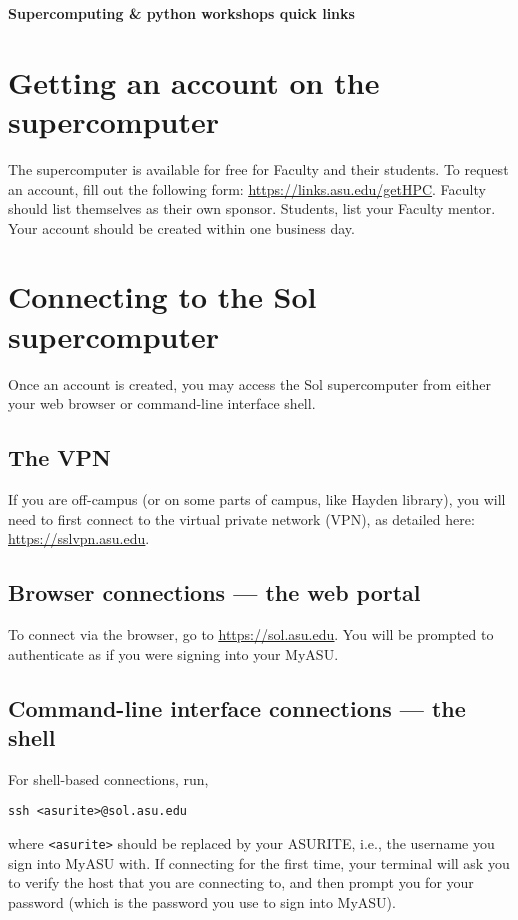 \documentclass[11pt]{article}
\newcommand{\myurl}[1]{\href{#1}{\color{blue}\setulcolor{blue}\ul{\mbox{#1}}}}
\def\gethpc{https://links.asu.edu/getHPC}
\begin{document}
{\centering\huge\bfseries Supercomputing \& python workshops quick links}

\setcounter{section}{-1}
\section{Getting an account on the supercomputer}

The supercomputer is available for free for Faculty and their students. 
To request an account, fill out the following form: 
\myurl{\gethpc}.
Faculty should list themselves as their own sponsor. 
Students, list your Faculty mentor.
Your account should be created within one business day.

\section{Connecting to the Sol supercomputer}

Once an account is created, you may access the Sol supercomputer from
either your web browser or command-line interface shell. 

\setcounter{subsection}{-1}
\subsection{The VPN}\label{sec:VPN}
If you are off-campus (or on some parts of campus, like Hayden library),
you will need to first connect to the virtual private network (VPN), as
detailed here:
\myurl{https://sslvpn.asu.edu}.

\subsection{Browser connections --- the web portal}\label{sec:ood}

To connect via the browser, go to
\myurl{https://sol.asu.edu}.
You will be prompted to authenticate as if you were signing into your
MyASU.

\subsection{Command-line interface connections --- the shell}\label{sec:shell}

For shell-based connections, run,
\begin{lstlisting}
ssh <asurite>@sol.asu.edu
\end{lstlisting}
where \texttt{<asurite>} should be replaced by your ASURITE, i.e., the
username you sign into MyASU with. If connecting for the first time,
your terminal will ask you to verify the host that you are connecting
to, and then prompt you for your password (which is the password you use
to sign into MyASU).
\end{document}
